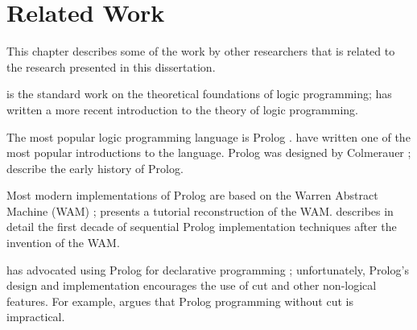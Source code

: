\chapter{Related Work}\label{relatedworkchapter}

This chapter describes some of the work by other researchers that is
related to the research presented in this dissertation.  


\citeauthor{lloyd:lp} \citeyearpar{lloyd:lp} is the standard work on
the theoretical foundations of logic programming; \citeauthor{doets}
\citeyearpar{doets} has written a more recent introduction to the
theory of logic programming.

The most popular logic programming language is Prolog
\cite{ISO:1995:IIIe,ISO:2000:IIIf}.  \citeauthor{ClocksinMellish}
\citeyearpar{ClocksinMellish} have written one of the most popular
introductions to the language.  Prolog was designed by Colmerauer
\cite{prologtenfigs,prologthree}; \citeauthor{birthofprolog}
\citeyearpar{birthofprolog} describe the early history of Prolog.

Most modern implementations of Prolog are based on the Warren Abstract
Machine (WAM) \cite{AICPub641:1983}; \citeauthor{wamtutorial}
\citeyearpar{wamtutorial} presents a tutorial reconstruction of the
WAM.  \citeauthor{DBLP:journals/jlp/Roy94}
\citeyearpar{DBLP:journals/jlp/Roy94} describes in detail the first
decade of sequential Prolog implementation techniques after the
invention of the WAM.

\citeauthor{declproginprolog} has advocated using Prolog for
declarative programming \citeyearpar{declproginprolog}; unfortunately,
Prolog's design and implementation encourages the use of cut and other
non-logical features.  For example, \citeauthor{Naish:1995pr}
\citeyearpar{Naish:1995pr} argues that Prolog programming without cut
is impractical.




